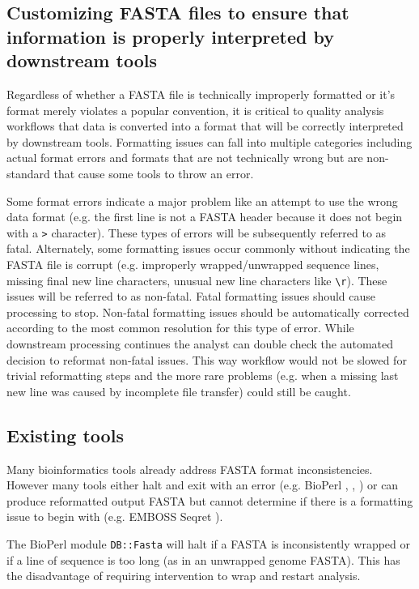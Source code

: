 \subsection{Customizing FASTA files to ensure that information is properly interpreted by downstream tools}

Regardless of whether a FASTA file is technically improperly formatted or it's format merely violates a popular convention, it is critical to quality analysis workflows that data is converted into a format that will be correctly interpreted by downstream tools. Formatting issues can fall into multiple categories including actual format errors and formats that are not technically wrong but are non-standard that cause some tools to throw an error. 

Some format errors indicate a major problem like an attempt to use the wrong data format (e.g. the first line is not a FASTA header because it does not begin with a \verb|>| character). These types of errors will be subsequently referred to as fatal. Alternately, some formatting issues occur commonly without indicating the FASTA file is corrupt (e.g. improperly wrapped/unwrapped sequence lines, missing final new line characters, unusual new line characters like \verb|\r|). These issues will be referred to as non-fatal. Fatal formatting issues should cause processing to stop. Non-fatal formatting issues should be automatically corrected according to the most common resolution for this type of error. While downstream processing continues the analyst can double check the automated decision to reformat non-fatal issues. This way workflow would not be slowed for trivial reformatting steps and the more rare problems (e.g. when a missing last new line was caused by incomplete file transfer) could still be caught.
  
\subsection{Existing tools}

Many bioinformatics tools already address FASTA format inconsistencies. However many tools either halt and exit with an error (e.g. BioPerl \cite{bioperl}, \cite{bioperl2}, \cite{bioperl3}) or can produce reformatted output FASTA but cannot determine if there is a formatting issue to begin with (e.g. EMBOSS Seqret \cite{PMID:10827456}). 

The BioPerl module \verb|DB::Fasta| will halt if a FASTA is inconsistently wrapped or if a line of sequence is too long (as in an unwrapped genome FASTA). This has the disadvantage of requiring intervention to wrap and restart analysis.

